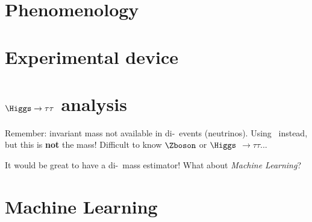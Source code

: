 \subsection*{}
\section{Phenomenology}


\subsection*{}
\section{Experimental device}

%

\subsection*{}
\section{$\Higgs\to\tau\tau$ analysis}


\begin{frame}
\manip Remember: invariant mass not available in di-\tau\ events (neutrinos).
\submanip Using \mTtot\ instead, but this is \textbf{not} the mass!
\submanip Difficult to know $\Zboson$ or $\Higgs$ $\to\tau\tau$...

\vfill

\manip It would be great to have a di-\tau\ mass estimator!
\submanip What about \emph{Machine Learning}?
\end{frame}

\subsection*{}
\section{Machine Learning}

